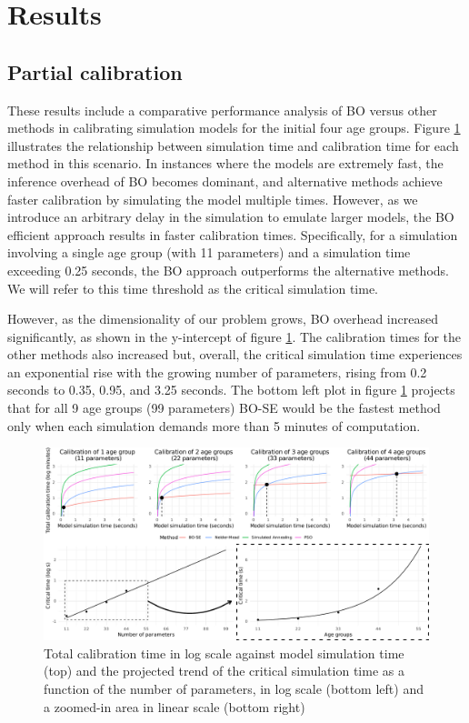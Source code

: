 \documentclass[sn-mathphys,Numbered]{sn-jnl}%
\begin{document}
\section{Results}

\subsection{Partial calibration}
\label{sec:results-partial}
These results include a comparative performance analysis of BO versus other methods in calibrating simulation models for the initial four age groups. Figure \ref{fig:sim_times} illustrates the relationship between simulation time and calibration time for each method in this scenario. In instances where the models are extremely fast, the inference overhead of BO becomes dominant, and alternative methods achieve faster calibration by simulating the model multiple times. However, as we introduce an arbitrary delay in the simulation to emulate larger models, the BO efficient approach results in faster calibration times. Specifically, for a simulation involving a single age group (with 11 parameters) and a simulation time exceeding 0.25 seconds, the BO approach outperforms the alternative methods. We will refer to this time threshold as the critical simulation time.

However, as the dimensionality of our problem grows, BO overhead increased significantly, as shown in the y-intercept of figure \ref{fig:sim_times}. The calibration times for the other methods also increased but, overall, the critical simulation time experiences an exponential rise with the growing number of parameters, rising from 0.2 seconds to 0.35, 0.95, and 3.25 seconds. The bottom left plot in figure \ref{fig:sim_times} projects that for all 9 age groups (99 parameters) BO-SE would be the fastest method only when each simulation demands more than 5 minutes of computation.

\begin{figure}[h!]
	\centering	
	\includegraphics[width=\textwidth]{figs/crit_times_log.pdf}		
	\caption{Total calibration time in log scale against model simulation time (top) and the projected trend of the critical simulation time as a function of the number of parameters, in log scale (bottom left) and a zoomed-in area in linear scale (bottom right)}
	\label{fig:sim_times}	
\end{figure}
\end{document}
